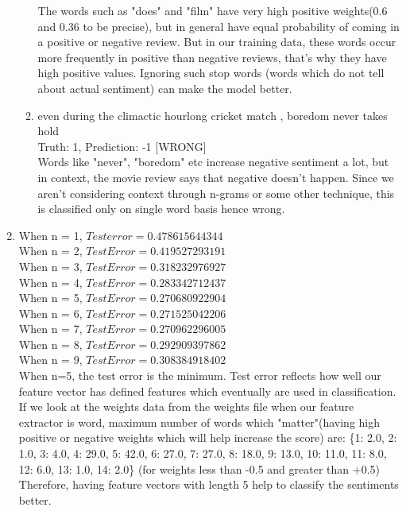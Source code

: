 \documentclass[12pt]{article}
\begin{document}
\begin{enumerate}[label=(\alph*)]
\begin{enumerate}[label=(\arabic*)]
		The words such as "does" and "film" have very high positive weights(0.6 and 0.36 to be precise), but in general have equal probability of coming in a positive or negative review. But in our training data, these words occur more frequently in positive than negative reviews, that's why they have high positive values.  Ignoring such stop words (words which do not tell about actual sentiment) can make the model better.
		
		\item even during the climactic hourlong cricket match , boredom never takes hold \\
		Truth: 1, Prediction: -1 [WRONG] \\
		
		Words like "never", "boredom" etc increase negative sentiment a lot, but in context, the movie review says that negative doesn't happen. Since we aren't considering context through n-grams or some other technique, this is classified only on single word basis hence wrong.
	\end{enumerate}
	\addtocounter{enumi}{1}
	\item When n = 1, $Test error = 0.478615644344$ \\
	When n = 2, $Test Error = 0.419527293191$ \\
	When n = 3, $Test Error = 0.318232976927$ \\
	When n = 4, $Test Error = 0.283342712437$ \\
	When n = 5, $Test Error = 0.270680922904$ \\
	When n = 6, $Test Error = 0.271525042206$ \\
	When n = 7, $Test Error = 0.270962296005$ \\
	When n = 8, $Test Error = 0.292909397862$ \\
	When n = 9, $Test Error = 0.308384918402$ \\

	When n=5, the test error is the minimum. Test error reflects how well our feature vector has defined features which eventually are used in classification. If we look at the weights data from the weights file when our feature extractor is word, maximum number of words which "matter"(having high positive or negative weights which will help increase the score) are:
	\{1: 2.0, 2: 1.0, 3: 4.0, 4: 29.0, 5: 42.0, 6: 27.0, 7: 27.0, 8: 18.0, 9: 13.0, 10: 11.0, 11: 8.0, 12: 6.0, 13: 1.0, 14: 2.0\} (for weights less than -0.5 and greater than +0.5) \\
	
	Therefore, having feature vectors with length 5 help to classify the sentiments better. \\
	

\end{enumerate}
\end{document}
